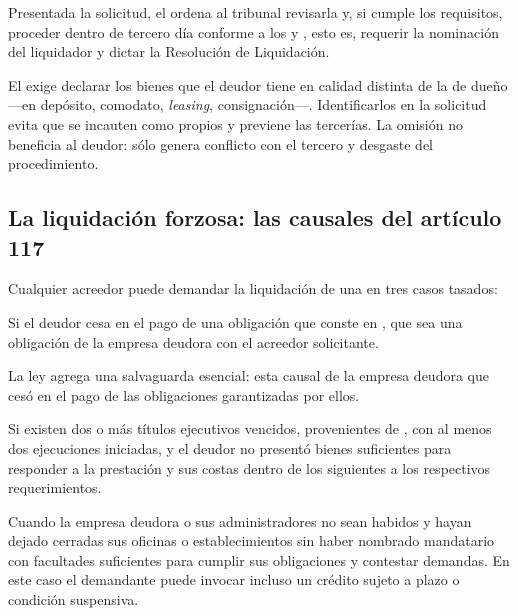 
Presentada la solicitud, el  ordena al tribunal revisarla y, si cumple los
requisitos, proceder dentro de tercero día conforme a los  y , esto es,
requerir la nominación del liquidador y dictar la Resolución de Liquidación.

\begin{practica}
El  exige declarar los bienes que el deudor tiene en calidad distinta de la de
dueño ---en depósito, comodato, \emph{leasing}, consignación---. Identificarlos en la
solicitud evita que se incauten como propios y previene las tercerías. La omisión no
beneficia al deudor: sólo genera conflicto con el tercero y desgaste del procedimiento.
\end{practica}

\subsection{La liquidación forzosa: las causales del artículo 117}

Cualquier acreedor puede demandar la liquidación de una \empresadeudora{} en tres casos
tasados:

\begin{description}[leftmargin=0pt,style=nextline,font=\sffamily\bfseries]
  \item[Causal 1 — Cesación en el pago de un título ejecutivo] Si el deudor cesa en el pago
  de una obligación que conste en , que sea una
  obligación  de la empresa deudora con el acreedor
  solicitante.

  La ley agrega una salvaguarda esencial: esta causal  de la empresa deudora
  que cesó en el pago de las obligaciones garantizadas por ellos.

  \item[Causal 2 — Dos ejecuciones sin bienes suficientes] Si existen dos o más títulos
  ejecutivos vencidos, provenientes de , con al menos dos
  ejecuciones iniciadas, y el deudor no presentó bienes suficientes para responder a la
  prestación y sus costas dentro de los  siguientes a los respectivos
  requerimientos.

  \item[Causal 3 — Deudor no habido] Cuando la empresa deudora o sus administradores no
  sean habidos y hayan dejado cerradas sus oficinas o establecimientos sin haber nombrado
  mandatario con facultades suficientes para cumplir sus obligaciones y contestar demandas.
  En este caso el demandante puede invocar incluso un crédito sujeto a plazo o condición
  suspensiva.
\end{description}

